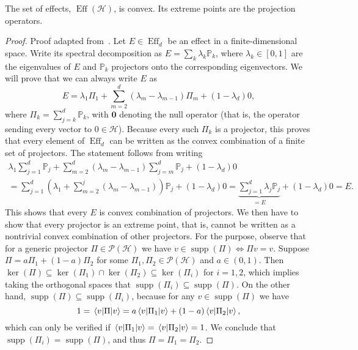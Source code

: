 \documentclass[12pt]{report}
\newcommand{\PP}{\mathbb{P}}
\newcommand{\on}[1]{\operatorname{#1}}
\newcommand{\bs}[1]{\boldsymbol{#1}}
\newcommand{\calH}{{\mathcal{H}}}
\newcommand{\calP}{{\mathcal{P}}}
\begin{document}
\begin{prop}
	The set of effects, $\on{Eff}(\calH)$, is convex. Its extreme points are the projection operators.
\end{prop}
\begin{proof}
	Proof adapted from~\parencite{caves2004gleasontype}.
	Let $E\in\on{Eff}_d$ be an effect in a finite-dimensional space.
	Write its spectral decomposition as
	$E = \sum_k \lambda_k \PP_k$, where $\lambda_k\in[0,1]$ are the eigenvalues of $E$ and $\PP_k$ projectors onto the corresponding eigenvectors.
	We will prove that we can always write $E$ as
	\begin{equation}
		E = \lambda_1 \Pi_1 + \sum_{m=2}^d (\lambda_m-\lambda_{m-1})\Pi_m + (1-\lambda_d) 0,
	\end{equation}
	where $\Pi_k=\sum_{j=k}^d\PP_k$, with $\bs 0$ denoting the null operator (that is, the operator sending every vector to $0\in\calH$).
	Because every such $\Pi_k$ is a projector, this proves that every element of $\on{Eff}_d$ can be written as the convex combination of a finite set of projectors.
	The statement follows from writing
	\begin{equation}
	\begin{gathered}
		\lambda_1\sum_{j=1}^d \PP_j
		+ \sum_{m=2}^d(\lambda_m-\lambda_{m-1})\sum_{j=m}^d \PP_j
		+ (1-\lambda_d)0 \\
		= \sum_{j=1}^d \left(\lambda_1 + \sum_{m=2}^j (\lambda_m-\lambda_{m-1})\right) \PP_j
		+ (1-\lambda_d) 0
		= \underbrace{\sum_{j=1}^d \lambda_j \PP_j}_{=E} + (1-\lambda_d) 0 = E.
	\end{gathered}
	\end{equation}
	This shows that every $E$ is convex combination of projectors. We then have to show that every projector is an extreme point, that is, cannot be written as a nontrivial convex combination of other projectors.
	For the purpose, observe that for a generic projector $\Pi\in\calP(\calH)$ we have $v\in\on{supp}(\Pi)\Longleftrightarrow \Pi v=v$.
	Suppose $\Pi=a\Pi_1+(1-a)\Pi_2$ for some $\Pi_1,\Pi_2\in\calP(\calH)$ and $a\in(0,1)$.
	Then $\ker(\Pi)\subseteq\ker(\Pi_1)\cap\ker(\Pi_2)\subseteq\ker(\Pi_i)$ for $i=1,2$, which implies taking the orthogonal spaces that $\on{supp}(\Pi_i)\subseteq\on{supp}(\Pi)$.
	On the other hand, $\on{supp}(\Pi)\subseteq\on{supp}(\Pi_i)$, because for any $v\in\on{supp}(\Pi)$ we have
	\begin{equation}
		1 = \mel{v}{\Pi}{v}
		= a\mel{v}{\Pi_1}{v} + (1-a) \mel{v}{\Pi_2}{v},
	\end{equation}
	which can only be verified if $\mel{v}{\Pi_1}{v}=\mel{v}{\Pi_2}{v}=1$.
	We conclude that $\on{supp}(\Pi_i)=\on{supp}(\Pi)$, and thus $\Pi=\Pi_1=\Pi_2$.
\end{proof}
\end{document}
